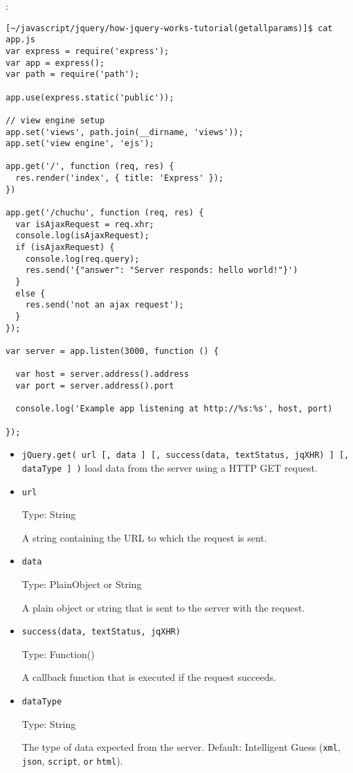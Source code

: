 

:

\begin{verbatim}
[~/javascript/jquery/how-jquery-works-tutorial(getallparams)]$ cat app.js
var express = require('express');
var app = express();
var path = require('path');

app.use(express.static('public'));

// view engine setup
app.set('views', path.join(__dirname, 'views'));
app.set('view engine', 'ejs');

app.get('/', function (req, res) {
  res.render('index', { title: 'Express' });
})

app.get('/chuchu', function (req, res) {
  var isAjaxRequest = req.xhr;
  console.log(isAjaxRequest);
  if (isAjaxRequest) {
    console.log(req.query);
    res.send('{"answer": "Server responds: hello world!"}')
  }
  else {
    res.send('not an ajax request');
  }
});

var server = app.listen(3000, function () {

  var host = server.address().address
  var port = server.address().port

  console.log('Example app listening at http://%s:%s', host, port)

});
\end{verbatim}

\begin{itemize}
\item \verb|jQuery.get( url [, data ] [, success(data, textStatus, jqXHR) ] [, dataType ] )|
load data from the server using a HTTP GET request.

\item \verb|url|

Type: String

A string containing the URL to which the request is sent.
\item \verb|data|

Type: PlainObject or String

A plain object or string that is sent to the server with the request.
\item \verb|success(data, textStatus, jqXHR)|

Type: Function()

A callback function that is executed if the request succeeds.
\item \verb|dataType|

Type: String

The type of data expected from the server. Default: Intelligent Guess 
(\verb|xml|, \verb|json|, \verb|script|, \verb|or| \verb|html|).
\end{itemize}

